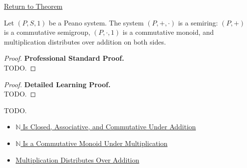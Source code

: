 \newpage
{}
\label{prf:n-is-semiring}

\begin{remark*}[Return]
\hyperref[thm:n-is-semiring]{Return to Theorem}
\end{remark*}

\begin{theorem*}
Let $(P,S,1)$ be a Peano system. The system $(P,+,\cdot)$ is a semiring:
$(P,+)$ is a commutative semigroup, $(P,\cdot,1)$ is a commutative monoid,
and multiplication distributes over addition on both sides.
\end{theorem*}

\begin{proof}
\textbf{Professional Standard Proof.}~\\
TODO.
\end{proof}

\begin{proof}
\textbf{Detailed Learning Proof.}~\\
TODO.
\end{proof}

\begin{remark*}
TODO.
\end{remark*}

\begin{dependencies}
\begin{itemize}
  \item \hyperref[thm:n-additive-structure]{$\mathbb{N}$ Is Closed, Associative, and Commutative Under Addition}
  \item \hyperref[thm:n-multiplicative-monoid]{$\mathbb{N}$ Is a Commutative Monoid Under Multiplication}
  \item \hyperref[thm:multiplication-distributes-over-addition]{Multiplication Distributes Over Addition}
\end{itemize}
\end{dependencies}
